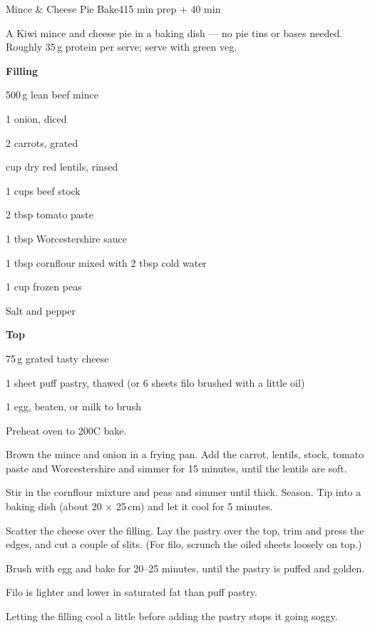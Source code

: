 \begin{recipebox}{Mince \& Cheese Pie Bake}{4}{15 min prep + 40 min}

A Kiwi mince and cheese pie in a baking dish --- no pie tins or bases needed.
Roughly 35\,g protein per serve; serve with green veg.

\begin{ingredients}
  \item[] \textbf{Filling}
  \item 500\,g lean beef mince
  \item 1 onion, diced
  \item 2 carrots, grated
  \item {} cup dry red lentils, rinsed
  \item 1 cups beef stock
  \item 2 tbsp tomato paste
  \item 1 tbsp Worcestershire sauce
  \item 1 tbsp cornflour mixed with 2 tbsp cold water
  \item 1 cup frozen peas
  \item Salt and pepper
  \item[] \textbf{Top}
  \item 75\,g grated tasty cheese
  \item 1 sheet puff pastry, thawed (or 6 sheets filo brushed with a little oil)
  \item 1 egg, beaten, or milk to brush
\end{ingredients}

\begin{method}
  \item Preheat oven to 200\degree C bake.
  \item Brown the mince and onion in a frying pan. Add the carrot, lentils, stock, tomato paste and Worcestershire and simmer for 15 minutes, until the lentils are soft.
  \item Stir in the cornflour mixture and peas and simmer until thick. Season. Tip into a baking dish (about 20 $\times$ 25\,cm) and let it cool for 5 minutes.
  \item Scatter the cheese over the filling. Lay the pastry over the top, trim and press the edges, and cut a couple of slits. (For filo, scrunch the oiled sheets loosely on top.)
  \item Brush with egg and bake for 20--25 minutes, until the pastry is puffed and golden.
\end{method}

\begin{notelist}
  \item Filo is lighter and lower in saturated fat than puff pastry.
  \item Letting the filling cool a little before adding the pastry stops it going soggy.
\end{notelist}

\end{recipebox}
